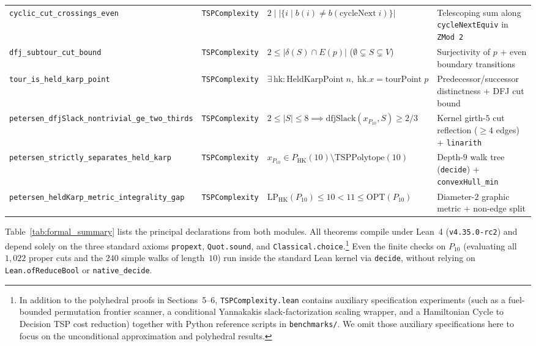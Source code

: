\begin{table}[t]
{\begin{tabular}{@{}llll@{}}
\midrule
\texttt{cyclic\_cut\_crossings\_even} & \texttt{TSPComplexity} & $2 \mid |\{i \mid b(i) \ne b(\mathrm{cycleNext}\;i)\}|$ & Telescoping sum along \texttt{cycleNextEquiv} in \texttt{ZMod 2} \\
\texttt{dfj\_subtour\_cut\_bound} & \texttt{TSPComplexity} & $2 \le |\delta(S) \cap E(p)|$ ($\emptyset \subsetneq S \subsetneq V$) & Surjectivity of $p$ + even boundary transitions \\
\texttt{tour\_is\_held\_karp\_point} & \texttt{TSPComplexity} & $\exists\,\mathrm{hk} : \mathrm{HeldKarpPoint}\;n,\; \mathrm{hk}.x = \mathrm{tourPoint}\;p$ & Predecessor/successor distinctness + DFJ cut bound \\
\texttt{petersen\_dfjSlack\_nontrivial\_ge\_two\_thirds} & \texttt{TSPComplexity} & $2 \le |S| \le 8 \implies \mathrm{dfjSlack}(x_{P_{10}}, S) \ge 2/3$ & Kernel girth-$5$ cut reflection ($\ge 4$ edges) + \texttt{linarith} \\
\texttt{petersen\_strictly\_separates\_held\_karp} & \texttt{TSPComplexity} & $x_{P_{10}} \in P_{\mathrm{HK}}(10) \setminus \mathrm{TSPPolytope}(10)$ & Depth-$9$ walk tree (\texttt{decide}) + \texttt{convexHull\_min} \\
\texttt{petersen\_heldKarp\_metric\_integrality\_gap} & \texttt{TSPComplexity} & $\mathrm{LP}_{\mathrm{HK}}(P_{10}) \le 10 < 11 \le \mathrm{OPT}(P_{10})$ & Diameter-$2$ graphic metric + non-edge split \\
\bottomrule
\end{tabular}%
}
\end{table}

Table~\ref{tab:formal_summary} lists the principal declarations from both modules. All theorems compile under Lean~4 (\texttt{v4.35.0-rc2}) and depend solely on the three standard axioms \texttt{propext}, \texttt{Quot.sound}, and \texttt{Classical.choice}.\footnote{In addition to the polyhedral proofs in Sections~5--6, \texttt{TSPComplexity.lean} contains auxiliary specification experiments (such as a fuel-bounded permutation frontier scanner, a conditional Yannakakis slack-factorization scaling wrapper, and a Hamiltonian Cycle to Decision TSP cost reduction) together with Python reference scripts in \texttt{benchmarks/}. We omit those auxiliary specifications here to focus on the unconditional approximation and polyhedral results.} Even the finite checks on $P_{10}$ (evaluating all $1{,}022$ proper cuts and the $240$ simple walks of length~$10$) run inside the standard Lean kernel via \texttt{decide}, without relying on \texttt{Lean.ofReduceBool} or \texttt{native\_decide}.

